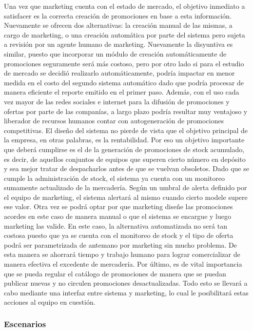 \indent Una vez que marketing cuenta con el estado de mercado, el objetivo inmediato a satisfacer es la correcta creación de promociones en base a esta información. Nuevamente se ofrecen dos alternativas: la creación manual de las mismas, a cargo de marketing, o una creación automática por parte del sistema pero sujeta a revisión por un agente humano de marketing. Nuevamente la disyuntiva es similar, puesto que incorporar un módulo de creación automáticamente de promociones seguramente será más costoso, pero por otro lado si para el estudio de mercado se decidió realizarlo automáticamente, podría impactar en menor medida en el costo del segundo sistema automático dado que podría procesar de manera eficiente el reporte emitido en el primer paso. Además, con el uso cada vez mayor de las redes sociales e internet para la difusión de promociones y ofertas por parte de las companías, a largo plazo podría resultar muy ventajoso y liberador de recursos humanos contar con autogeneración de promociones competitivas.
El diseño del sistema no pierde de vista que el objetivo principal de la empresa, en otras palabras, es la rentabilidad. Por eso un objetivo importante que deberá cumplirse es el de la generación de promociones de stock acumulado, es decir, de aquellos conjuntos de equipos que superen cierto número en depósito y sea mejor tratar de despacharlos antes de que se vuelvan obsoletos. Dado que se cumple la administración de stock, el sistema ya cuenta con un monitoreo sumamente actualizado de la mercadería. Según un umbral de alerta definido por el equipo de marketing, el sistema alertará al mismo cuando cierto modele supere ese valor. Otra vez se podrá optar por que marketing diseñe las promociones acordes en este caso de manera manual o que el sistema se encargue y luego marketing las valide. En este caso, la alternativa automatizada no será tan costosa puesto que ya se cuenta con el monitoreo de stock y el tipo de oferta podrá ser parametrizada de antemano por marketing sin mucho problema. De esta manera se ahorrará tiempo y trabajo humano para lograr comercializar de manera efectiva el excedente de mercadería. Por último, es de vital importancia que se pueda regular el catálogo de promociones de manera que se puedan publicar nuevas y no circulen promociones desactualizadas. Todo esto se llevará a cabo mediante una interfaz entre sistema y marketing, lo cual le posibilitará estas acciones al equipo en cuestión.

\subsubsection{Escenarios}

